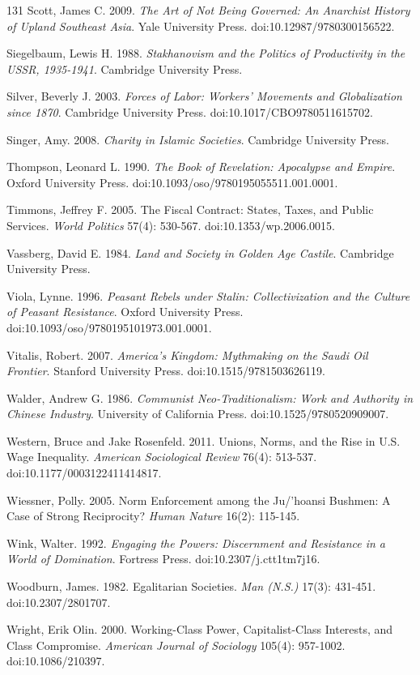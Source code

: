 \documentclass[11pt,letterpaper]{article}
\theoremstyle{definition}
\theoremstyle{remark}
\begin{document}
\begin{thebibliography}{131}
Scott, James C. 2009. \emph{The Art of Not Being Governed: An Anarchist History of Upland Southeast Asia}. Yale University Press. doi:10.12987/9780300156522.

Siegelbaum, Lewis H. 1988. \emph{Stakhanovism and the Politics of Productivity in the USSR, 1935-1941}. Cambridge University Press.

Silver, Beverly J. 2003. \emph{Forces of Labor: Workers' Movements and Globalization since 1870}. Cambridge University Press. doi:10.1017/CBO9780511615702.

Singer, Amy. 2008. \emph{Charity in Islamic Societies}. Cambridge University Press.

Thompson, Leonard L. 1990. \emph{The Book of Revelation: Apocalypse and Empire}. Oxford University Press. doi:10.1093/oso/9780195055511.001.0001.

Timmons, Jeffrey F. 2005. The Fiscal Contract: States, Taxes, and Public Services. \emph{World Politics} 57(4): 530-567. doi:10.1353/wp.2006.0015.

Vassberg, David E. 1984. \emph{Land and Society in Golden Age Castile}. Cambridge University Press.

Viola, Lynne. 1996. \emph{Peasant Rebels under Stalin: Collectivization and the Culture of Peasant Resistance}. Oxford University Press. doi:10.1093/oso/9780195101973.001.0001.

Vitalis, Robert. 2007. \emph{America's Kingdom: Mythmaking on the Saudi Oil Frontier}. Stanford University Press. doi:10.1515/9781503626119.

Walder, Andrew G. 1986. \emph{Communist Neo-Traditionalism: Work and Authority in Chinese Industry}. University of California Press. doi:10.1525/9780520909007.

Western, Bruce and Jake Rosenfeld. 2011. Unions, Norms, and the Rise in U.S. Wage Inequality. \emph{American Sociological Review} 76(4): 513-537. doi:10.1177/0003122411414817.

Wiessner, Polly. 2005. Norm Enforcement among the Ju/'hoansi Bushmen: A Case of Strong Reciprocity? \emph{Human Nature} 16(2): 115-145.

Wink, Walter. 1992. \emph{Engaging the Powers: Discernment and Resistance in a World of Domination}. Fortress Press. doi:10.2307/j.ctt1tm7j16.

Woodburn, James. 1982. Egalitarian Societies. \emph{Man (N.S.)} 17(3): 431-451. doi:10.2307/2801707.

Wright, Erik Olin. 2000. Working-Class Power, Capitalist-Class Interests, and Class Compromise. \emph{American Journal of Sociology} 105(4): 957-1002. doi:10.1086/210397.
\end{thebibliography}
\end{document}

